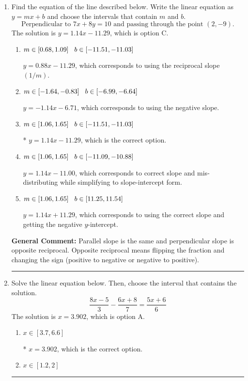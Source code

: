 \documentclass{extbook}[14pt]
\newcommand{\litem}[1]{\item #1

\rule{\textwidth}{0.4pt}}
\begin{document}
\begin{enumerate}\litem{
Find the equation of the line described below. Write the linear equation as $ y=mx+b $ and choose the intervals that contain $m$ and $b$.
\[ \text{Perpendicular to } 7 x + 8 y = 10 \text{ and passing through the point } (2, -9). \]
The solution is \( y = 1.14x - 11.29 \), which is option C.\begin{enumerate}[label=\Alph*.]
\item \( m \in [0.68, 1.09] \hspace*{3mm} b \in [-11.51, -11.03] \)

 $y = 0.88x - 11.29$, which corresponds to using the reciprocal slope $(1/m)$.
\item \( m \in [-1.64, -0.83] \hspace*{3mm} b \in [-6.99, -6.64] \)

 $y = -1.14x - 6.71$, which corresponds to using the negative slope.
\item \( m \in [1.06, 1.65] \hspace*{3mm} b \in [-11.51, -11.03] \)

* $y = 1.14x - 11.29$, which is the correct option.
\item \( m \in [1.06, 1.65] \hspace*{3mm} b \in [-11.09, -10.88] \)

 $y = 1.14x - 11.00$, which corresponds to correct slope and mis-distributing while simplifying to slope-intercept form.
\item \( m \in [1.06, 1.65] \hspace*{3mm} b \in [11.25, 11.54] \)

 $y = 1.14x + 11.29$, which corresponds to using the correct slope and getting the negative $y$-intercept.
\end{enumerate}

\textbf{General Comment:} Parallel slope is the same and perpendicular slope is opposite reciprocal. Opposite reciprocal means flipping the fraction and changing the sign (positive to negative or negative to positive).
}
\litem{
Solve the linear equation below. Then, choose the interval that contains the solution.
\[ \frac{8x -5}{3} - \frac{6x + 8}{7} = \frac{5x + 6}{6} \]
The solution is \( x = 3.902 \), which is option A.\begin{enumerate}[label=\Alph*.]
\item \( x \in [3.7, 6.6] \)

* $x = 3.902$, which is the correct option.
\item \( x \in [1.2, 2] \)


\end{enumerate}}
\end{enumerate}
\end{document}
